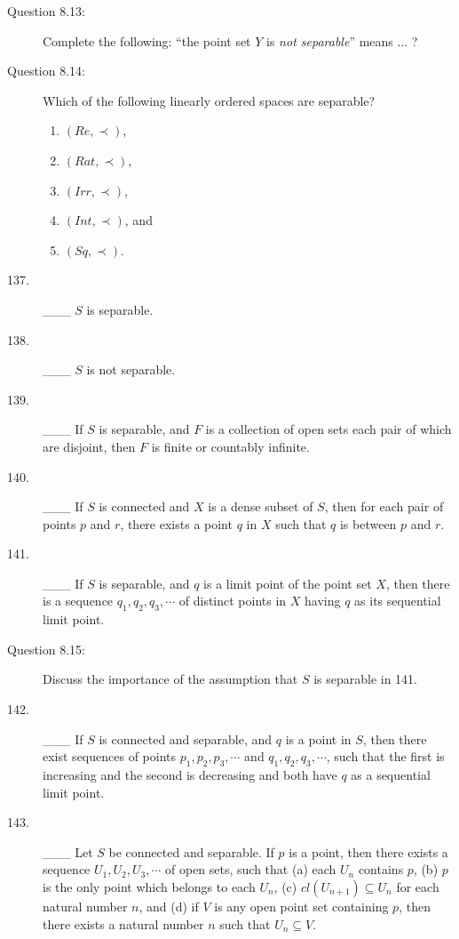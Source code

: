 \documentclass{book}
\begin{document}
\begin{description}
\item[Question 8.13:] Complete the following: ``the point set $Y$ is \emph{not separable}'' means ... ?

\item[Question 8.14:] Which of the following linearly ordered spaces are separable? 
\begin{enumerate}[\hspace{1cm}(a)]
  \item $(Re, \prec)$, 
  \item $(Rat, \prec)$, 
  \item $(Irr, \prec)$, 
  \item $(Int, \prec)$, and 
  \item $(Sq, \prec)$.
\end{enumerate}

\item[137.] \_\_\_ $S$ is separable.

\item[138.] \_\_\_ $S$ is not separable.

\item[139.] \_\_\_ If $S$ is separable, and $F$ is a collection of open sets each pair of which are disjoint, then $F$ is finite or countably infinite.

\item[140.] \_\_\_ If $S$ is connected and $X$ is a dense subset of $S$, then for each pair of points $p$ and $r$, there exists a point $q$ in $X$ such that $q$ is between $p$ and $r$.

\item[141.] \_\_\_ If $S$ is separable, and $q$ is a limit point of the point set $X$, then there is a sequence $q_{1}, q_{2}, q_{3}, \cdots$ of distinct points in $X$ having $q$ as its sequential limit point.

\item[Question 8.15:] Discuss the importance of the assumption that $S$ is separable in 141.

\item[142.] \_\_\_ If $S$ is connected and separable, and $q$ is a point in $S$, then there exist sequences of points $p_{1}, p_{2}, p_{3}, \cdots$ and $q_{1}, q_{2}, q_{3}, \cdots$, such that the first is increasing and the second is decreasing and both have $q$ as a sequential limit point.

\item[143.] \_\_\_ Let $S$ be connected and separable. If $p$ is a point, then there exists a sequence $U_{1}, U_{2}, U_{3}, \cdots$ of open sets, such that (a) each $U_{n}$ contains $p$, (b) $p$ is the only point which belongs to each $U_{n}$, (c) $cl(U_{n+1}) \subseteq U_{n}$ for each natural number $n$, and (d) if $V$ is any open point set containing $p$, then there exists a natural number $n$ such that $U_{n} \subseteq V$.


\end{description}
\end{document}
